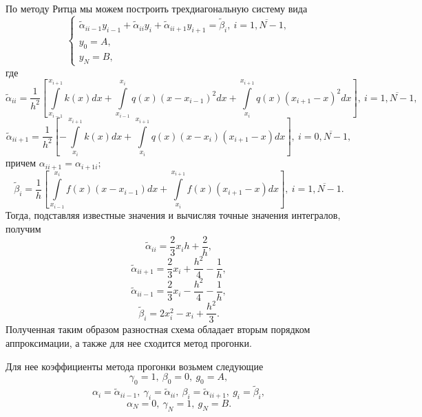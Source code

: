 \documentclass[a4paper, 12pt]{article}
\begin{document}
По методу Ритца мы можем построить
трехдиагональную систему вида \begin{equation}
        \begin{cases}
            \tilde\alpha_{ii-1} y_{i-1} + \tilde\alpha_{ii} y_i + \tilde\alpha_{i i+1} y_{i+1} = \tilde\beta_i,\ i = \overline {1, N -1},\\
            y_0 = A,\\
            y_N = B,
        \end{cases}
    \end{equation} где
\[\tilde\alpha_{ii} = \dfrac{1}{h^2}\left[ \int\limits_{x_{i-1}}^{x_{i+1}} k(x)dx +\int\limits_{x_{i-1}}^{x_i}q(x)(x-x_{i-1})^2dx + \int\limits_{x_i}^{x_{i+1}}q(x)(x_{i+1}-x)^2dx \right],\ i = \overline{1, N-1},\]
\[\tilde\alpha_{ii+1} = \dfrac{1}{h^2} \left[-\int\limits_{x_i}^{x_{i+1}}k(x)dx + \int\limits_{x_i}^{x_{i+1}}q(x)(x-x_i)(x_{i+1} - x)dx\right],\ i = \overline {0, N-1},\]
причем \(\alpha_{ii+1} = \alpha_{i+1i}\);
\[\tilde\beta_i = \dfrac{1}{h} \left[\int\limits_{x_{i-1}}^{x_i}f(x)(x-x_{i-1})dx + \int\limits_{x_i}^{x_{i+1}}f(x)(x_{i+1}-x)dx\right],\ i = \overline{1, N-1}.\]
Тогда, подставляя известные значения и вычисляя точные значения
интегралов, получим
\[\tilde\alpha_{ii} = \dfrac 2 3 x_i h + \dfrac 2 h,\]
\[\tilde\alpha_{ii+1} = \dfrac 2 3 x_i + \dfrac{h^2}4 - \dfrac 1 h,\]
\[\tilde\alpha_{ii-1} = \dfrac 2 3 x_i - \dfrac{h^2}4 - \dfrac 1 h,\]
\[\tilde\beta_i = 2x_i^2 -x_i + \dfrac{h^2}{3}.\] Полученная таким
образом разностная схема обладает вторым порядком аппроксимации, а также
для нее сходится метод прогонки.

Для нее
коэффициенты метода прогонки возьмем следующие
\[\gamma_0 = 1,\ \beta_0 = 0,\ g_0 = A,\]
\[\alpha_i = \tilde\alpha_{ii-1},\ \gamma_i = \tilde\alpha_{ii}, \ \beta_i=\tilde\alpha_{ii+1},\ g_i = \tilde\beta_i,\]
\[\alpha_N = 0,\ \gamma_N = 1,\ g_N = B.\]
\end{document}
